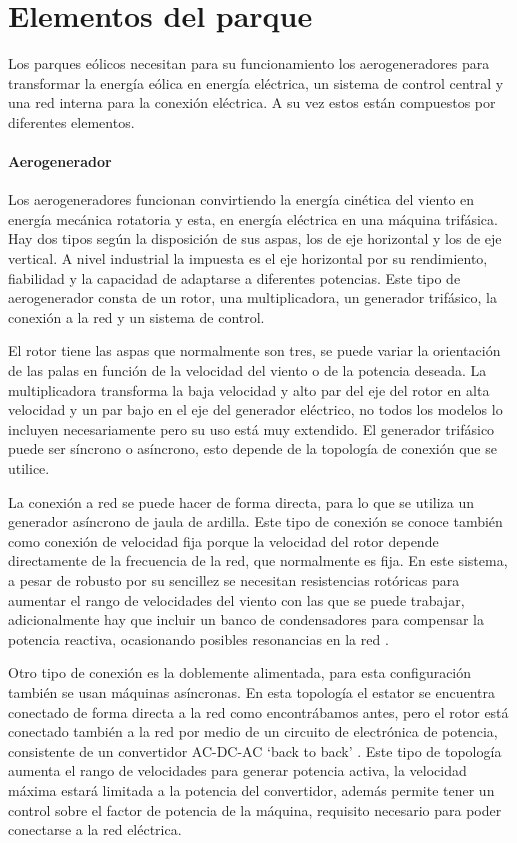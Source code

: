 \documentclass{book}
\begin{document}
	\section{Elementos del parque}
Los parques e\'olicos necesitan para su funcionamiento los aerogeneradores para transformar la energ\'ia e\'olica en energ\'ia el\'ectrica, un sistema de control central y una red interna para la conexi\'on el\'ectrica. A su vez estos est\'an compuestos por diferentes elementos.

		\paragraph{Aerogenerador}
		Los aerogeneradores funcionan convirtiendo la energ\'ia cin\'etica del viento en energ\'ia mec\'anica rotatoria y esta, en energ\'ia el\'ectrica en una m\'aquina trif\'asica. Hay dos tipos seg\'un la disposici\'on de sus aspas, los de eje horizontal y los de eje vertical. A nivel industrial la impuesta es el eje horizontal por su rendimiento, fiabilidad y la capacidad de adaptarse a diferentes potencias. Este tipo de aerogenerador consta de un rotor, una multiplicadora, un generador trif\'asico, la conexi\'on a la red y un sistema de control. \par
		El rotor tiene las aspas que normalmente son tres, se puede variar la orientaci\'on de las palas en funci\'on de la velocidad del viento o de la potencia deseada. La multiplicadora transforma la baja velocidad y alto par del eje del rotor en alta velocidad y un par bajo en el eje del generador el\'ectrico, no todos los modelos lo incluyen necesariamente pero su uso est\'a muy extendido. El generador trif\'asico puede ser s\'incrono  o as\'incrono, esto depende de la topolog\'ia de conexi\'on que se utilice.  \par
		La conexi\'on a red se puede hacer de forma directa, para lo que se utiliza un generador as\'incrono de jaula de ardilla. Este tipo de conexi\'on se conoce tambi\'en como conexi\'on de velocidad fija porque la velocidad del rotor depende directamente de la frecuencia de la red, que normalmente es fija. En este sistema, a pesar de robusto por su sencillez se necesitan resistencias rot\'oricas para aumentar el rango de velocidades del viento con las que se puede trabajar, adicionalmente hay que incluir un banco de condensadores para compensar la potencia reactiva, ocasionando posibles resonancias en la red \cite{TopologiasWT}. \par 
		Otro tipo de conexi\'on es la doblemente alimentada, para esta configuraci\'on tambi\'en se usan m\'aquinas as\'incronas. En esta topolog\'ia el estator se encuentra conectado de forma directa a  la red como encontr\'abamos antes, pero el rotor est\'a conectado tambi\'en a la red por medio de un circuito de electr\'onica de potencia, consistente de un convertidor AC-DC-AC ‘back to back’ \cite{AerogeneradorDIFG}. Este tipo de topolog\'ia aumenta el rango de velocidades para generar potencia activa, la velocidad m\'axima estar\'a limitada a la potencia del convertidor, adem\'as permite tener un control sobre el factor de potencia de la m\'aquina, requisito necesario para poder conectarse a la red el\'ectrica. \par
\end{document}
